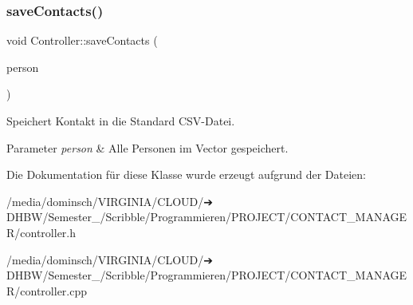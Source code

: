 \subsubsection{\texorpdfstring{save\+Contacts()}{saveContacts()}}
{\footnotesize\ttfamily void Controller\+::save\+Contacts (\begin{DoxyParamCaption}\item[{vector$<$ \hyperlink{classContactManager_1_1Person}{Person} $>$ \&}]{person }\end{DoxyParamCaption})}



Speichert Kontakt in die Standard C\+S\+V-\/\+Datei.


\begin{DoxyParams}{Parameter}
{\em person} & Alle Personen im Vector gespeichert.\\
\hline
\end{DoxyParams}


Die Dokumentation für diese Klasse wurde erzeugt aufgrund der Dateien\+:\begin{DoxyCompactItemize}
\item 
/media/dominsch/\+V\+I\+R\+G\+I\+N\+I\+A/\+C\+L\+O\+U\+D/➔ D\+H\+B\+W/\+Semester\+\_/\+Scribble/\+Programmieren/\+P\+R\+O\+J\+E\+C\+T/\+C\+O\+N\+T\+A\+C\+T\+\_\+\+M\+A\+N\+A\+G\+E\+R/controller.\+h\item 
/media/dominsch/\+V\+I\+R\+G\+I\+N\+I\+A/\+C\+L\+O\+U\+D/➔ D\+H\+B\+W/\+Semester\+\_/\+Scribble/\+Programmieren/\+P\+R\+O\+J\+E\+C\+T/\+C\+O\+N\+T\+A\+C\+T\+\_\+\+M\+A\+N\+A\+G\+E\+R/controller.\+cpp\end{DoxyCompactItemize}
